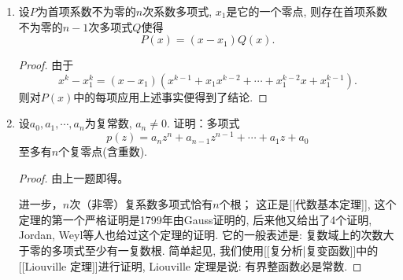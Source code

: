 \begin{1b}
\begin{enumerate}
\item[1.] 设\(P\)为首项系数不为零的\(n\)次系数多项式, \(x_1\)是它的一个零点, 
则存在首项系数不为零的\(n-1\)次多项式\(Q\)使得\[P(x)=(x-x_1)Q(x).\]
\begin{proof}
由于\[x^k-x_1^k=(x-x_1)\left(x^{k-1}+x_1x^{k-2}+\cdots+x_1^{k-2}x+x_1^{k-1}\right).\]则对\(P(x)\)中的每项应用上述事实便得到了结论.
\end{proof}
\item[2.] 设\(a_0,a_1,\cdots,a_n\)为复常数, \(a_n\ne 0\). 证明：多项式
\[p(z)=a_nz^n+a_{n-1}z^{n-1}+\cdots+a_1z+a_0\]至多有\(n\)个复零点(含重数).
\begin{proof}
由上一题即得。

进一步，$n$次（非零）复系数多项式恰有$n$个根；
这正是[[代数基本定理]], 这个定理的第一个严格证明是1799年由Gauss证明的, 
后来他又给出了4个证明, Jordan, Weyl等人也给过这个定理的证明. 
它的一般表述是: 复数域上的次数大于零的多项式至少有一复数根. 
简单起见, 我们使用[[复分析|复变函数]]中的[[Liouville 定理]]进行证明, 
Liouville 定理是说: 有界整函数必是常数.


\end{proof}
\end{enumerate}
\end{1b}
